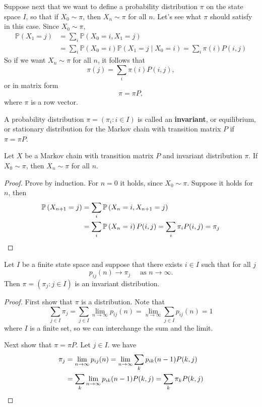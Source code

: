 \documentclass[a4paper,11pt]{article}
\begin{document}
Suppose next that we want to define a probability distribution $\pi$ on the state space $I$, so that if $X_0 \sim \pi$, then $X_n \sim \pi$ for all $n$. Let's see what $\pi$ should satisfy in this case. Since $X_0 \sim \pi$,
\begin{align*}
    \mathbb{P}\left(X_1=j\right)&=\sum_i \mathbb{P}\left(X_0=i, X_1=j\right)\\ 
    &=\sum_i \mathbb{P}\left(X_0=i\right) \mathbb{P}\left(X_1=j \mid X_0=i\right)=\sum_i \pi(i) P(i, j)
\end{align*}
So if we want $X_n \sim \pi$ for all $n$, it follows that
\[
\pi(j)=\sum_i \pi(i) P(i, j),
\]
or in matrix form
\[
\pi=\pi P,
\]
where $\pi$ is a row vector.

\begin{definition}
    A probability distribution $\pi=\left(\pi_i: i \in I\right)$ is called an \textbf{invariant}, or equilibrium, or stationary distribution for the Markov chain with transition matrix $P$ if $\pi=\pi P$.
\end{definition}

\begin{theorem}
    Let $X$ be a Markov chain with transition matrix $P$ and invariant distribution $\pi$. If $X_0 \sim \pi$, then $X_n \sim \pi$ for all $n$.
\end{theorem}
\begin{proof}
    Prove by induction. For $n=0$ it holds, since $X_0 \sim \pi$. Suppose it holds for $n$, then
    \begin{align*}
        \mathbb{P}\left(X_{n+1}=j\right)&=\sum_i \mathbb{P}\left(X_n=i, X_{n+1}=j\right)\\ 
        &=\sum_i \mathbb{P}\left(X_n=i\right) P(i, j)=\sum_i \pi_i P(i, j)=\pi_j\qedhere
    \end{align*}
\end{proof}

\begin{theorem}
    Let $I$ be a finite state space and suppose that there exists $i \in I$ such that for all $j$
    \[
    p_{i j}(n) \rightarrow \pi_j \quad \text { as } n \rightarrow \infty .
    \]
    Then $\pi=\left(\pi_j: j \in I\right)$ is an invariant distribution.
\end{theorem}

\begin{proof}
    First show that $\pi$ is a distribution. Note that
    \[
    \sum_{j \in I} \pi_j=\sum_{j \in I} \lim _{n \rightarrow \infty} p_{i j}(n)=\lim _{n \rightarrow \infty} \sum_{j \in I} p_{i j}(n)=1
    \]
    where $I$ is a finite set, so we can interchange the sum and the limit.

    Next show that $\pi=\pi P$. Let $j \in I$. we have
    \begin{align*}
        \pi_j&=\lim _{n \rightarrow \infty} p_{i j}(n)=\lim _{n \rightarrow \infty} \sum_k p_{i k}(n-1) P(k, j)\\ 
        &=\sum_k \lim _{n \rightarrow \infty} p_{i k}(n-1) P(k, j)=\sum_k \pi_k P(k, j)\qedhere
    \end{align*}
\end{proof}
\end{document}
